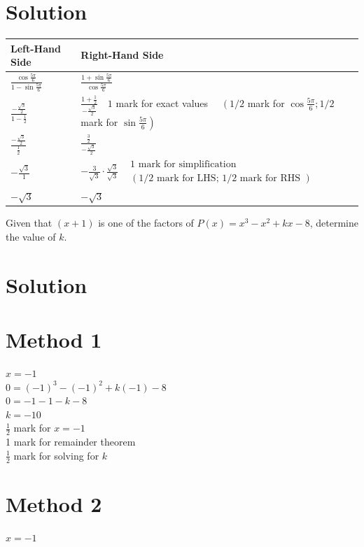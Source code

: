 \documentclass[10pt]{article}
\begin{document}
\section*{Solution}
\begin{center}
\begin{tabular}{|l|l|}
\hline
Left-Hand Side & Right-Hand Side \\
\hline
$\frac{\cos \frac{5 \pi}{6}}{1-\sin \frac{5 \pi}{6}}$ & $\frac{1+\sin \frac{5 \pi}{6}}{\cos \frac{5 \pi}{6}}$ \\
\hline
$\frac{-\frac{\sqrt{3}}{2}}{1-\frac{1}{2}}$ & $\frac{1+\frac{1}{2}}{-\frac{\sqrt{3}}{2}} \quad 1$ mark for exact values $\quad\left(1 / 2\right.$ mark for $\cos \frac{5 \pi}{6} ; 1 / 2$ mark for $\left.\sin \frac{5 \pi}{6}\right)$ \\
\hline
$\frac{-\frac{\sqrt{3}}{2}}{\frac{1}{2}}$ & $\frac{\frac{3}{2}}{-\frac{\sqrt{3}}{2}}$ \\
\hline
$-\frac{\sqrt{3}}{1}$ & $-\frac{3}{\sqrt{3}} \cdot \frac{\sqrt{3}}{\sqrt{3}} \begin{aligned} & 1 \text { mark for simplification } \\ & (1 / 2 \text { mark for LHS; } 1 / 2 \text { mark for RHS })\end{aligned}$ \\
\hline
$-\sqrt{3}$ & $-\sqrt{3}$ \\
\hline
\end{tabular}
\end{center}

Given that $(x+1)$ is one of the factors of $P(x)=x^{3}-x^{2}+k x-8$, determine the value of $k$.

\section*{Solution}
\section*{Method 1}
$x=-1$\\
$0=(-1)^{3}-(-1)^{2}+k(-1)-8$\\
$0=-1-1-k-8$\\
$k=-10$\\
$\frac{1}{2}$ mark for $x=-1$\\
1 mark for remainder theorem\\
$\frac{1}{2}$ mark for solving for $k$

\section*{Method 2}
$x=-1$
\end{document}
